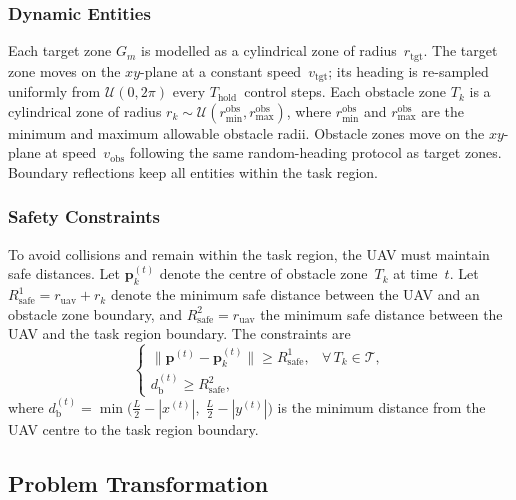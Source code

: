 \subsubsection{Dynamic Entities}

Each target zone $G_m$ is modelled as a cylindrical zone of radius~$r_{\mathrm{tgt}}$.
The target zone moves on the $xy$-plane at a constant speed~$v_{\mathrm{tgt}}$;
its heading is re-sampled uniformly from $\mathcal{U}(0, 2\pi)$ every
$T_{\mathrm{hold}}$~control steps.
Each obstacle zone $T_k$ is a cylindrical zone of radius
$r_k \sim \mathcal{U}(r_{\min}^{\mathrm{obs}}, r_{\max}^{\mathrm{obs}})$,
where $r_{\min}^{\mathrm{obs}}$ and $r_{\max}^{\mathrm{obs}}$ are the minimum
and maximum allowable obstacle radii.
Obstacle zones move on the $xy$-plane at speed~$v_{\mathrm{obs}}$ following
the same random-heading protocol as target zones.
Boundary reflections keep all entities within the task region.

\subsubsection{Safety Constraints}

To avoid collisions and remain within the task region, the UAV must maintain
safe distances.
Let $\mathbf{p}_k^{(t)}$ denote the centre of obstacle zone~$T_k$ at
time~$t$.
Let $R_{\mathrm{safe}}^{1} = r_{\mathrm{uav}} + r_k$ denote the minimum safe
distance between the UAV and an obstacle zone boundary, and
$R_{\mathrm{safe}}^{2} = r_{\mathrm{uav}}$ the minimum safe distance
between the UAV and the task region boundary.
The constraints are
\begin{equation}
  \begin{cases}
    \lVert\mathbf{p}^{(t)} - \mathbf{p}_k^{(t)}\rVert
      \ge R_{\mathrm{safe}}^{1},
    & \forall\, T_k \in \mathcal{T}, \\[4pt]
    d_{\mathrm{b}}^{(t)} \ge R_{\mathrm{safe}}^{2},
  \end{cases}
  \label{eq:safety}
\end{equation}
where
$d_{\mathrm{b}}^{(t)} = \min\!\bigl(
  \tfrac{L}{2} - |x^{(t)}|,\;
  \tfrac{L}{2} - |y^{(t)}|
\bigr)$
is the minimum distance from the UAV centre to the task region boundary.

\subsection{Problem Transformation}
\label{subsec:problem_transformation}

